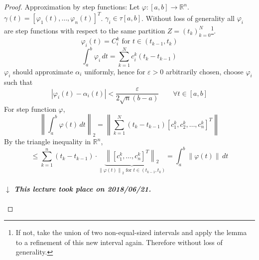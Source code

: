 \documentclass{article}
\newcommand{\norm}[1]{\left\|#1\right\|}
\newcommand{\card}[1]{\left|#1\right|}
\newcommand{\dateref}[1]{%
  \begin{mdframed}[backgroundcolor=gray!10,innerbottommargin=0pt,innertopmargin=0pt]
    \paragraph{\textit{$\downarrow$ This lecture took place on #1.}}%
  \end{mdframed}%
}
\begin{document}
\begin{proof}
  Approximation by step functions: Let $\varphi: [a,b] \to \mathbb R^n$.
  $\gamma(t) = \left[\varphi_1(t), \dots, \varphi_n(t)\right]^T$.
  $\gamma_i \in \tau[a,b]$. Without loss of generality all $\varphi_i$ are step functions with respect to the same partition $Z = (t_k)_{k=0}^N$\footnote{If not, take the union of two non-equal-sized intervals and apply the lemma to a refinement of this new interval again. Therefore without loss of generality.}.
  \[ \varphi_i(t) = C_i^k \text{ for } t \in (t_{k-1}, t_k) \]
  \[ \int_a^b \varphi_i \, dt = \sum_{k=1}^N c_i^k (t_k - t_{k-1}) \]
  $\varphi_i$ should approximate $\alpha_i$ uniformly, hence for $\varepsilon > 0$ arbitrarily chosen, choose $\varphi_i$ such that
  \[ \card{\varphi_i(t) - \alpha_i(t)} < \frac{\varepsilon}{2 \sqrt n (b - a)} \qquad \forall t \in [a,b] \]
  For step function $\varphi$,
  \[ \norm{\int_a^b \varphi(t) \, dt}_2 = \norm{\sum_{k=1}^N (t_k - t_{k-1}) \left[c_1^k, c_2^k, \dots, c_n^k\right]^T} \]
  By the triangle inequality in $\mathbb R^n$,
  \[ \leq \sum_{k=1}^n (t_k - t_{k-1}) \cdot \underbrace{\norm{\left[c_1^k, \dots, c_n^k\right]^T}_2}_{\norm{\varphi(t)}_2 \text{ for } t \in (t_{k-1}, t_k)} = \int_a^b \norm{\varphi(t)} \, dt \]

  \dateref{2018/06/21}


\end{proof}
\end{document}
